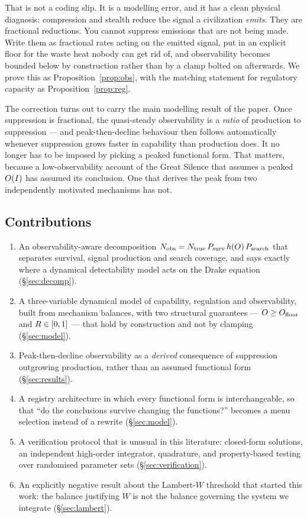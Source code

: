 That is not a coding slip. It is a modelling error, and it has a clean physical
diagnosis: compression and stealth reduce the signal a civilization
\emph{emits}. They are fractional reductions. You cannot suppress emissions that
are not being made. Write them as fractional rates acting on the emitted signal,
put in an explicit floor for the waste heat nobody can get rid of, and
observability becomes bounded below by construction rather than by a clamp
bolted on afterwards. We prove this as Proposition~\ref{prop:obs}, with the
matching statement for regulatory capacity as Proposition~\ref{prop:reg}.

The correction turns out to carry the main modelling result of the paper. Once
suppression is fractional, the quasi-steady observability is a \emph{ratio} of
production to suppression --- and peak-then-decline behaviour then follows
automatically whenever suppression grows faster in capability than production
does. It no longer has to be imposed by picking a peaked functional form. That
matters, because a low-observability account of the Great Silence that assumes a
peaked $O(I)$ has assumed its conclusion. One that derives the peak from
two independently motivated mechanisms has not.

\subsection{Contributions}

\begin{enumerate}\itemsep3pt
  \item An observability-aware decomposition
    $N_{\mathrm{obs}} = N_{\mathrm{true}}\,P_{\mathrm{surv}}\,h(O)\,P_{\mathrm{search}}$ that separates survival, signal
    production and search coverage, and says exactly where a dynamical
    detectability model acts on the Drake equation (\S\ref{sec:decomp}).
  \item A three-variable dynamical model of capability, regulation and
    observability, built from mechanism balances, with two structural
    guarantees --- $O \geq O_{\mathrm{floor}}$ and $R \in [0,1]$ --- that hold by
    construction and not by clamping (\S\ref{sec:model}).
  \item Peak-then-decline observability as a \emph{derived} consequence of
    suppression outgrowing production, rather than an assumed functional form
    (\S\ref{sec:results}).
  \item A registry architecture in which every functional form is
    interchangeable, so that ``do the conclusions survive changing the
    functions?'' becomes a menu selection instead of a rewrite
    (\S\ref{sec:model}).
  \item A verification protocol that is unusual in this literature: closed-form
    solutions, an independent high-order integrator, quadrature, and
    property-based testing over randomised parameter sets
    (\S\ref{sec:verification}).
  \item An explicitly negative result about the Lambert-$W$ threshold that
    started this work: the balance justifying $W$ is not the balance governing
    the system we integrate (\S\ref{sec:lambert}).
\end{enumerate}

